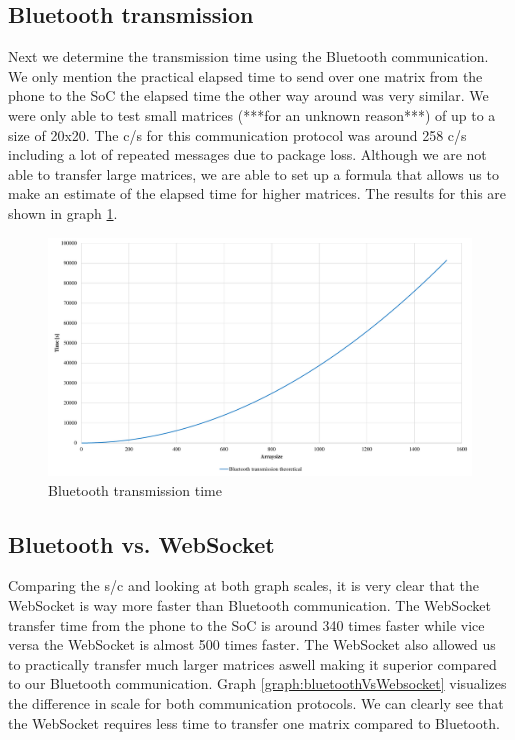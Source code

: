 \documentclass[a4paper, 11pt]{report}
\begin{document}
\subsection{Bluetooth transmission}
Next we determine the transmission time using the Bluetooth communication. We only mention the practical elapsed time to send over one matrix from the phone to the SoC the elapsed time the other way around was very similar. We were only able to test small matrices (***for an unknown reason***) of up to a size of 20x20. The c/s for this communication protocol was around 258 c/s including a lot of repeated messages due to package loss. Although we are not able to transfer large matrices, we are able to set up a formula that allows us to make an estimate of the elapsed time for higher matrices. The results for this are shown in graph \ref{graph:bluetoothTime}.

\begin{figure}[ht]
\centering
\includegraphics[scale=0.45]{images/BluetoothtransmissionSpeed.pdf}
\caption{Bluetooth transmission time}\label{graph:bluetoothTime}
\end{figure}

\subsection{Bluetooth vs. WebSocket}
Comparing the s/c and looking at both graph scales, it is very clear that the WebSocket is way more faster than Bluetooth communication. The WebSocket transfer time from the phone to the SoC is around 340 times faster while vice versa the WebSocket is almost 500 times faster. The WebSocket also allowed us to practically transfer much larger matrices aswell making it superior compared to our Bluetooth communication. Graph \ref{graph:bluetoothVsWebsocket} visualizes the difference in scale for both communication protocols. We can clearly see that the WebSocket requires less time to transfer one matrix compared to Bluetooth.
\end{document}
